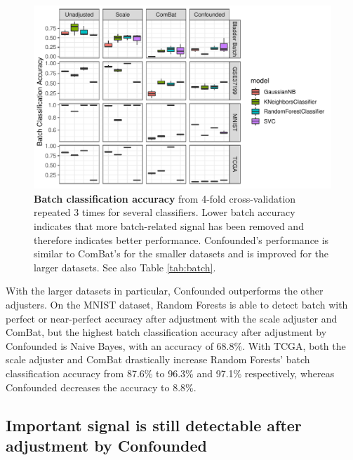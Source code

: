 \documentclass[notitlepage]{article}
\begin{document}
\begin{figure}
	\centering
	\includegraphics[width=\columnwidth]{figures/final/batch_accuracy.pdf}
	\caption{\textbf{Batch classification accuracy} from 4-fold cross-validation repeated 3 times for several classifiers.
	Lower batch accuracy indicates that more batch-related signal has been removed and therefore indicates better performance.
	Confounded's performance is similar to ComBat's for the smaller datasets and is improved for the larger datasets.
	See also Table \ref{tab:batch}.}
	\label{fig:batch}
\end{figure}
\begin{table}
	\centering
	
	\caption{\textbf{Batch classification accuracy} for several datasets and adjusters.
	The ideal batch adjuster would completely remove all signal due to batch and would therefore \textit{decrease} batch classification accuracy to around the baseline for all classifiers.
	See also Figure \ref{fig:batch}.}
	\label{tab:batch}
\end{table}

With the larger datasets in particular, Confounded outperforms the other adjusters.
On the MNIST dataset, Random Forests is able to detect batch with perfect or near-perfect accuracy after adjustment with the scale adjuster and ComBat, but the highest batch classification accuracy after adjustment by Confounded is Naive Bayes, with an accuracy of 68.8\%.
With TCGA, both the scale adjuster and ComBat drastically increase Random Forests' batch classification accuracy from 87.6\% to 96.3\% and 97.1\% respectively, whereas Confounded decreases the accuracy to 8.8\%.

\subsection{Important signal is still detectable after adjustment by Confounded}
\end{document}
